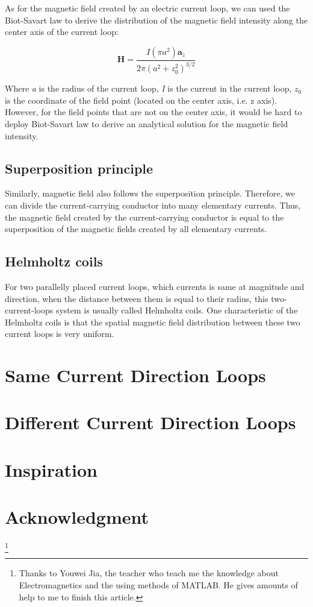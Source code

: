 \documentclass[10pt, journal, final]{IEEEtran}
\begin{document}
As for the magnetic field created by an electric current loop, we can used the Biot-Savart law to derive
the distribution of the magnetic field intensity along the center axis of the current loop:

\begin{equation}
    \mathbf{H} = \frac{I(\pi a^2)\mathbf{a}_z}{2\pi (a^2+z_0^2)^{3/2}}
\end{equation}

Where \emph{a} is the radius of the current loop, \emph{I} is the current in the current loop, $z_0$ is the coordinate
of the field point (located on the center axis, i.e. z axis). However, for the field points that are not on the center
axis, it would be hard to deploy Biot-Savart law to derive an analytical solution for the magnetic field intensity.\par

\subsection{
    Superposition principle
}
\label{subsec: Superposition}
Similarly, magnetic field also follows the superposition principle. Therefore, we can divide the current-carrying
conductor into many elementary currents. Thus, the magnetic field created by the current-carrying conductor is equal
to the superposition of the magnetic fields created by all elementary currents.

\subsection{
    Helmholtz coils
}
\label{subsec: Helmholtz}
For two parallelly placed current loops, which currents is same at magnitude and direction,
when the distance between them is equal to their radius, this two-current-loops system is usually called Helmholtz coils.
One characteristic of the Helmholtz coils is that
the spatial magnetic field distribution between these two current loops is very uniform.

\section{
  Same Current Direction Loops
 }
\label{sec: Same Direction}




\section{
  Different Current Direction Loops
 }
\label{sec: Diff Direction}




\section{
  Inspiration
 }
\label{sec: Ins}



\section*{Acknowledgment}
\thanks{
    Thanks to Youwei Jia, the teacher who teach me the knowledge about Electromagnetics
    and the using methods of MATLAB. He gives amounts of help to me to finish this article.
}
\end{document}
